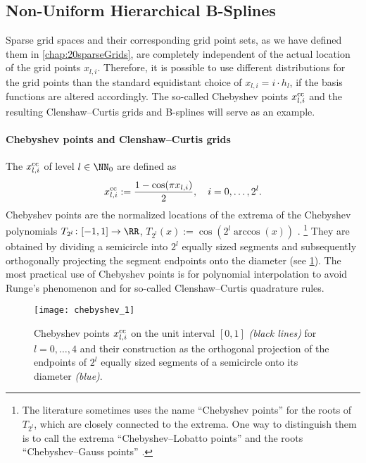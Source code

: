 \subsection{Non-Uniform Hierarchical B-Splines}

Sparse grid spaces and their corresponding grid point sets,
as we have defined them in \cref{chap:20sparseGrids},
are completely independent of the actual location of the grid points
$x_{l,i}$.
Therefore, it is possible to use different distributions for the grid points
than the standard equidistant choice of $x_{l,i} = i \cdot h_l$,
if the basis functions are altered accordingly.
The so-called Chebyshev points $x_{l,i}^{\mathrm{cc}}$ and the
resulting Clenshaw--Curtis grids and B-splines will serve as an example.

\paragraph{Chebyshev points and Clenshaw--Curtis grids}

%
The  $x_{l,i}^{\mathrm{cc}}$ of level $l \in \NN_0$
are defined as
\begin{equation}
  x_{l,i}^{\mathrm{cc}}
  := \frac{1 - \cos(\pi x_{l,i})}{2},\quad
  i = 0, \dotsc, 2^l.
\end{equation}
Chebyshev points are the normalized locations of the extrema of the
Chebyshev polynomials $T_{2^l}\colon [-1, 1] \to \RR$,
$T_{2^l}(x) := \cos(2^l \arccos(x))$ \cite{Xu16Chebyshev}.%
\footnote{%
  The literature sometimes uses the name ``Chebyshev points'' for
  the roots of $T_{2^l}$, which are closely connected to the extrema.
  One way to distinguish them is to call the extrema
  ``Chebyshev--Lobatto points'' and the roots
  ``Chebyshev--Gauss points'' \cite{Xu16Chebyshev}.%
}
They are obtained by dividing a semicircle into $2^l$ equally sized
segments and subsequently orthogonally projecting the
segment endpoints onto the diameter
(see \cref{fig:chebyshev}).
The most practical use of Chebyshev points is for
polynomial interpolation to avoid Runge's phenomenon and for
so-called Clenshaw--Curtis quadrature rules.

\begin{figure}
  \texttt{[image: chebyshev\_1]}%
  \caption{%
    Chebyshev points $x_{l,i}^{\mathrm{cc}}$ on the unit interval $[0, 1]$
    \emph{(black lines)}
    for $l = 0, \dotsc, 4$
    and their construction as the orthogonal projection of the
    endpoints of $2^l$ equally sized segments
    of a semicircle onto its diameter \emph{\textcolor{C0}{(blue)}}.%
  }
  \label{fig:chebyshev}
\end{figure}

